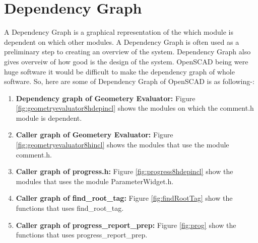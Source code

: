 \section{Dependency Graph}
A Dependency Graph is a graphical representation of the which module is dependent on which other modules. A Dependency Graph is often used as a preliminary step to creating an overview of the system. Dependency Graph also gives overveiw of how good is the design of the system.
OpenSCAD being were huge software it would be difficult to make the dependency graph of whole software. So, here are some of Dependency Graph of OpenSCAD is as following-:
\begin{enumerate}
	\item \textbf{Dependency graph of Geometery Evaluator:} Figure \ref{fig:geometryevaluator8hdepincl} shows the modules on which the comment.h module is dependent.
	\item \textbf{Caller graph of Geometery Evaluator:} Figure \ref{fig:geometryevaluator8hincl} shows the modules that use the module comment.h.
	\item \textbf{Caller graph of progress.h:} Figure \ref{fig:progress8hdepincl} show the modules that uses the module ParameterWidget.h.
	\item \textbf{Caller graph of find\_root\_tag:} Figure \ref{fig:findRootTag} show the functions that uses find\_root\_tag.
	
	\item \textbf{Caller graph of progress\_report\_prep:} Figure \ref{fig:prog} show the functions that uses progress\_report\_prep.
\end{enumerate}

